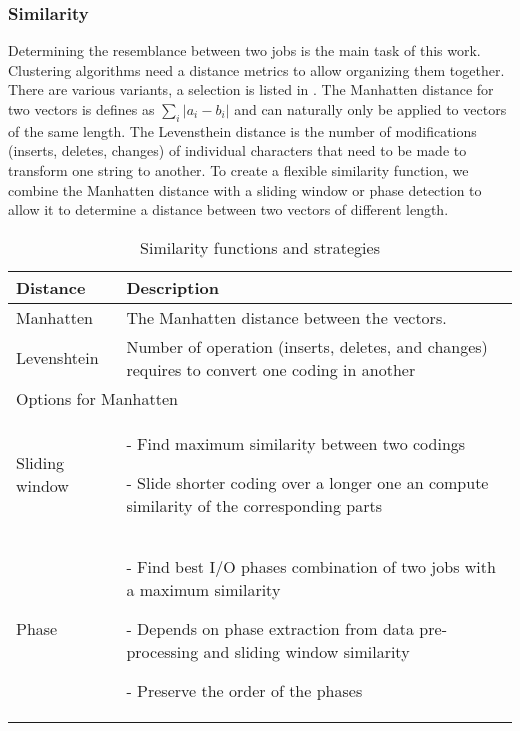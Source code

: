 \documentclass{jhps}
\begin{document}
\subsubsection{Similarity}
Determining the resemblance between two jobs is the main task of this work.
Clustering algorithms need a distance metrics to allow organizing them together.
There are various variants, a selection is listed in .
The Manhatten distance for two vectors is defines as $\sum_i |a_i - b_i|$ and can naturally only be applied to vectors of the same length.
The Levensthein distance is the number of modifications (inserts, deletes, changes) of individual characters that need to be made to transform one string to another.
To create a flexible similarity function, we combine the Manhatten distance with a sliding window or phase detection to allow it to determine a distance between two vectors of different length.

\begin{table}
  \centering
  \begin{tabularx}{\textwidth}{lX}
    Distance & Description \\
    \hline
    Manhatten & The Manhatten distance between the vectors.\\
    \hline
    Levenshtein &  Number of operation (inserts, deletes, and changes) requires to convert one coding in another \\
    \hline
    \hline
    \multicolumn{2}{l}{Options for Manhatten} \\
    \hline
    Sliding window &  - Find maximum similarity between two codings \par
            - Slide shorter coding over a longer one an compute similarity of the corresponding parts \\
    \hline
    Phase &  - Find best I/O phases combination of two jobs with a maximum similarity \par - Depends on phase extraction from data pre-processing and sliding window similarity \par - Preserve the order of the phases \\
    \hline
  \end{tabularx}
  \caption{Similarity functions and strategies}
  \label{tab:sim_funcs}
\end{table}
\end{document}
